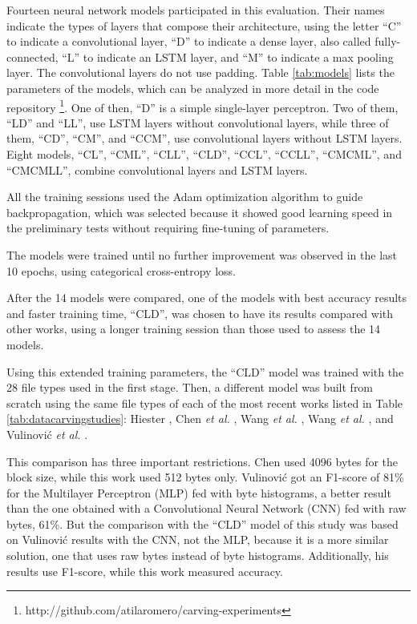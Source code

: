 Fourteen neural network models participated in this evaluation.
Their names indicate the types of layers that compose their architecture, using the letter ``C'' to indicate a convolutional layer, ``D'' to indicate a dense layer, also called fully-connected, ``L'' to indicate an LSTM layer, and ``M'' to indicate a max pooling layer. The convolutional layers do not use padding.
Table \ref{tab:models} lists the parameters of the models, which can be analyzed in more detail in the code repository \footnote{http://github.com/atilaromero/carving-experiments}. One of then, ``D'' is a simple single-layer perceptron. Two of them, ``LD'' and ``LL'', use LSTM layers without convolutional layers, while three of them, ``CD'', ``CM'', and ``CCM'', use convolutional layers without LSTM layers. Eight models, ``CL'', ``CML'', ``CLL'', ``CLD'', ``CCL'', ``CCLL'', ``CMCML'', and ``CMCMLL'', combine convolutional layers and LSTM layers. 



All the training sessions used the Adam \cite{kingma_adam:_2014}
optimization algorithm to guide backpropagation, which was selected because it showed good learning speed in the preliminary tests without requiring fine-tuning of parameters.

The models were trained until no further improvement was observed in the last 10 epochs, using categorical cross-entropy loss.


After the 14 models were compared, one of the models with best accuracy results and faster training time, ``CLD'', was chosen to have its results compared with other works, using a longer training session than those used to assess the 14 models.


Using this extended training parameters, the ``CLD'' model was trained with the 28 file types used in the first stage. Then, a different model was built from scratch using the same file types of each of the most recent works listed in Table \ref{tab:datacarvingstudies}: 
Hiester \cite{hiester_file_2018}, 
Chen \textit{et al.} \cite{chen_file_2018},
Wang \textit{et al.} \cite{wang_sparse_2018},
Wang \textit{et al.} \cite{wang_file_2018},
and
Vulinović \textit{et al.} \cite{vulinovic_neural_2019}.

This comparison has three important restrictions.
Chen used 4096 bytes for the block size, while this work used 512 bytes only.
Vulinović got an F1-score of 81\% for the Multilayer Perceptron (MLP) fed with byte histograms, a better result than the one obtained with a Convolutional Neural Network (CNN) fed with raw bytes, 61\%. But the comparison with the ``CLD'' model of this study was based on Vulinović results with the CNN, not the MLP, because it is a more similar solution, one that uses raw bytes instead of byte histograms. Additionally, his results use F1-score, while this work measured accuracy. 

